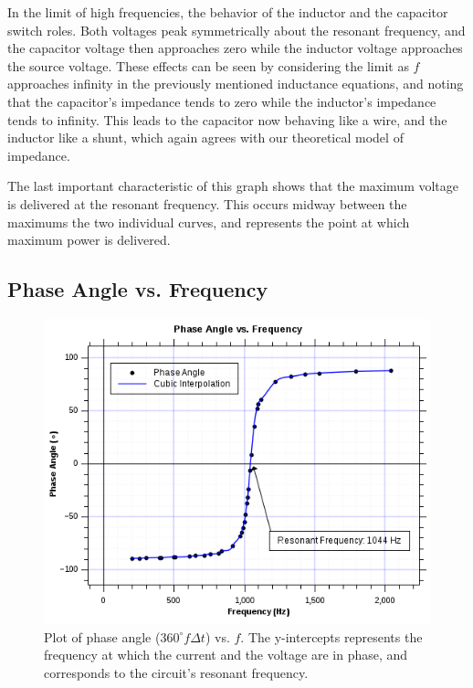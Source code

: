 \documentclass[twocolumn,english]{IEEEtran}
\theoremstyle{plain}
\theoremstyle{plain}
\begin{document}
In the limit of high frequencies, the behavior of the inductor and the capacitor switch roles. Both voltages peak symmetrically about the resonant frequency, and the capacitor voltage then approaches zero while the inductor voltage approaches the source voltage. These effects can be seen by considering the limit as $f$ approaches infinity in the previously mentioned inductance equations, and noting that the capacitor's impedance tends to zero while the inductor's impedance tends to infinity. This leads to the capacitor now behaving like a wire, and the inductor like a shunt, which again agrees with our theoretical model of impedance.

The last important characteristic of this graph shows that the maximum voltage is delivered at the resonant frequency. This occurs midway between the maximums the two individual curves, and represents the point at which maximum power is delivered.

\hrulefill

\subsection{Phase Angle vs. Frequency}

\begin{figure}[H]
	\begin{centering}
	\begin{center}
	\includegraphics[width=\linewidth]{./Images/Part7.png}
	\caption{Plot of phase angle ($360^{\circ}f\Delta t$) vs. $f$. The y-intercepts represents the frequency at which the current and the voltage are in phase, and corresponds to the circuit's resonant frequency. }
	\label{fig:PhasevsFreq}
	\end{center}
	\par\end{centering}
\end{figure}
\end{document}
